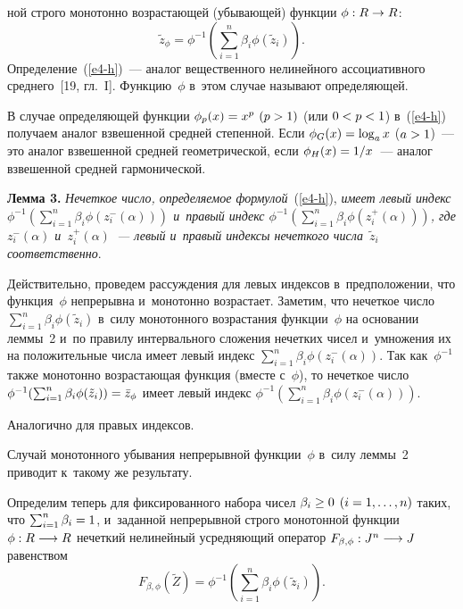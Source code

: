 \begin{multicols}{2}
\columnbreak

\noindent
ной строго монотонно возрастающей (убывающей) 
функции $\phi:R\hm\rightarrow R$:
\begin{equation}
\tilde{z}_{\phi} = \phi^{-1}\left(\sum\limits_{i=1}^n\beta_i\phi\left(\tilde{z}_i\right)\right).
\label{e4-h}
\end{equation}
 Определение~(\ref{e4-h})~--- аналог вещественного нелинейного ассоциативного среднего~[19, гл.~I]. Функцию~$\phi$ в~этом случае называют определяющей.

В случае определяющей функции $\phi_p(x) \hm= x^p$ $(p\hm>1)$ (или $0\hm<p\hm<1$) в~(\ref{e4-h}) 
получаем аналог взвешенной средней степенной. Если $\phi_G(x) \hm= 
\log_a x$ ($a\hm>1$)~--- это аналог взвешенной средней гео\-мет\-ри\-че\-ской, если 
$\phi_H(x) \hm= {1}/{x}$~--- аналог взвешенной средней гармонической.

\smallskip

\noindent
\textbf{Лемма 3.} \textit{Нечеткое чис\-ло, определяемое формулой}~(\ref{e4-h}), \textit{имеет левый 
индекс $\phi^{-1}(\sum\nolimits_{i=1}^n\beta_i\phi(z^{-}_i(\alpha)))$ и~правый 
индекс  $\phi^{-1}(\sum\nolimits_{i=1}^n\beta_i\phi(z^{+}_i(\alpha)))$, где $z^{-}_i(\alpha)$  
и~$z^{+}_i(\alpha)$~--- левый и~правый индексы нечеткого чис\-ла~$\tilde{z}_i$ соответственно}.

\smallskip

Действительно, проведем рассуждения для левых индексов в~предположении, что 
функция~$\phi$ непрерывна и~монотонно возрастает.
Заметим, что нечеткое чис\-ло $\sum\nolimits_{i=1}^n\beta_i\phi(\tilde{z}_i)$ в~силу 
монотонного возрастания функции~$\phi$ на основании леммы~2 и~по правилу 
интервального сложения нечетких чисел и~умножения их на положительные чис\-ла 
имеет левый индекс $\sum\nolimits_{i=1}^n\beta_i\phi(z_i^{-}(\alpha))$. Так как~$\phi^{-1}$ 
также монотонно возрастающая функция (вмес\-те с~$\phi$), то нечеткое 
чис\-ло $\phi^{-1}(\sum\nolimits_{i=1}^n\beta_i\phi(\tilde{z}_i))\hm = \bar{z}_{\phi}$ 
имеет левый индекс $\phi^{-1}(\sum\nolimits_{i=1}^n\beta_i\phi(z^{-}_i(\alpha)))$.

Аналогично для правых индексов.

Случай монотонного убывания непрерывной функции~$\phi$ в~силу леммы~2 приводит к~такому же результату.

Определим теперь для фиксированного набора чисел $\beta_i\hm\geq 
0$ $(i\hm=1,\ldots,n)$ таких, что $\sum\nolimits_{i=1}^n\beta_i \hm= 1$, и~заданной 
непрерывной строго монотонной функции $\phi:R\hm\longrightarrow R$ нечеткий 
нелинейный усредняющий оператор $F_{\beta,\phi}:J^n\hm\longrightarrow J$ 
равенством
\begin{equation}
F_{\beta,\phi}\left(\tilde{Z}\right) = \phi^{-1}\left(\sum\limits_{i=1}^n\beta_i\phi\left(\tilde{z}_i\right)\right).
\label{e5-h}
\end{equation}


\end{multicols}
